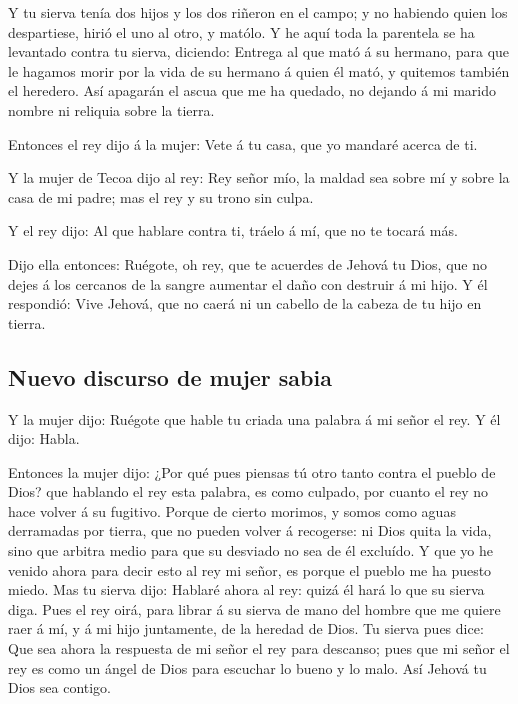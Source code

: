  Y tu sierva tenía dos hijos y los dos riñeron en el campo;
y no habiendo quien los despartiese, hirió el uno al otro, y matólo.
 Y he aquí toda la parentela se ha levantado contra tu
sierva, diciendo: Entrega al que mató á su hermano, para que le hagamos
morir por la vida de su hermano á quien él mató, y quitemos también el
heredero. Así apagarán el ascua que me ha quedado, no dejando á mi
marido nombre ni reliquia sobre la tierra.

 Entonces el rey dijo á la mujer: Vete á tu casa, que yo
mandaré acerca de ti.

 Y la mujer de Tecoa dijo al rey: Rey señor mío, la maldad
sea sobre mí y sobre la casa de mi padre; mas el rey y su trono sin
culpa.

 Y el rey dijo: Al que hablare contra ti, tráelo á mí, que
no te tocará más.

 Dijo ella entonces: Ruégote, oh rey, que te acuerdes de
Jehová tu Dios, que no dejes á los cercanos de la sangre aumentar el
daño con destruir á mi hijo. Y él respondió: Vive Jehová, que no caerá
ni un cabello de la cabeza de tu hijo en tierra.

\hypertarget{nuevo-discurso-de-mujer-sabia}{%
\subsection{Nuevo discurso de mujer
sabia}\label{nuevo-discurso-de-mujer-sabia}}

 Y la mujer dijo: Ruégote que hable tu criada una palabra á
mi señor el rey. Y él dijo: Habla.

 Entonces la mujer dijo: ¿Por qué pues piensas tú otro
tanto contra el pueblo de Dios? que hablando el rey esta palabra, es
como culpado, por cuanto el rey no hace volver á su fugitivo.
 Porque de cierto morimos, y somos como aguas derramadas
por tierra, que no pueden volver á recogerse: ni Dios quita la vida,
sino que arbitra medio para que su desviado no sea de él excluído.
 Y que yo he venido ahora para decir esto al rey mi señor,
es porque el pueblo me ha puesto miedo. Mas tu sierva dijo: Hablaré
ahora al rey: quizá él hará lo que su sierva diga.  Pues el
rey oirá, para librar á su sierva de mano del hombre que me quiere raer
á mí, y á mi hijo juntamente, de la heredad de Dios.  Tu
sierva pues dice: Que sea ahora la respuesta de mi señor el rey para
descanso; pues que mi señor el rey es como un ángel de Dios para
escuchar lo bueno y lo malo. Así Jehová tu Dios sea contigo.


